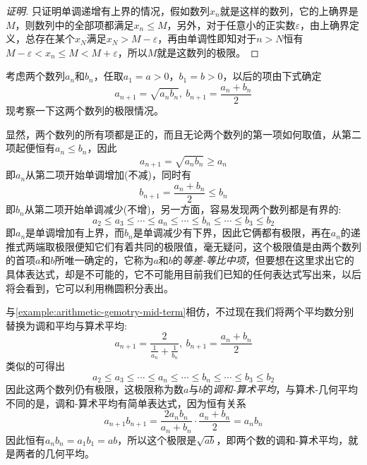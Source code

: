 \begin{proof}[证明]
  只证明单调递增有上界的情况，假如数列$x_n$就是这样的数列，它的上确界是$M$，则数列中的全部项都满足$x_n \leqslant M$，另外，对于任意小的正实数$\varepsilon$，由上确界定义，总存在某个$x_N$满足$x_N>M-\varepsilon$，再由单调性即知对于$n>N$恒有$M-\varepsilon < x_n \leqslant M < M+\varepsilon$，所以$M$就是这数列的极限。
\end{proof}

\begin{example}[等差-等比中项]
  \label{example:arithmetic-gemotry-mid-term}
  考虑两个数列$a_n$和$b_n$，任取$a_1=a>0$，$b_1=b>0$，以后的项由下式确定
  \[ a_{n+1} = \sqrt{a_nb_n}, \  b_{n+1}=\frac{a_n+b_n}{2} \]
  现考察一下这两个数列的极限情况。

  显然，两个数列的所有项都是正的，而且无论两个数列的第一项如何取值，从第二项起便恒有$a_n \leqslant b_n$，因此
  \[ a_{n+1} = \sqrt{a_nb_n} \geqslant a_n \]
  即$a_n$从第二项开始单调增加(不减)，同时有
  \[ b_{n+1} = \frac{a_n+b_n}{2} \leqslant b_n \]
  即$b_n$从第二项开始单调减少(不增)，另一方面，容易发现两个数列都是有界的:
  \[ a_2 \leqslant a_3 \leqslant \cdots \leqslant a_n \leqslant \cdots \leqslant b_n \leqslant \cdots \leqslant b_3 \leqslant b_2  \]
  即$a_n$是单调增加有上界，而$b_n$是单调减少有下界，因此它俩都有极限，再在$a_n$的递推式两端取极限便知它们有着共同的极限值，毫无疑问，这个极限值是由两个数列的首项$a$和$b$所唯一确定的，它称为$a$和$b$的\emph{等差-等比中项}，但要想在这里求出它的具体表达式，却是不可能的，它不可能用目前我们已知的任何表达式写出来，以后将会看到，它可以利用椭圆积分表出。
\end{example}

\begin{example}[调和-算术中项]
  \label{example:harmonic-arithmetic-mid-term}
  与\autoref{example:arithmetic-gemotry-mid-term}相仿，不过现在我们将两个平均数分别替换为调和平均与算术平均:
  \[ a_{n+1} = \frac{2}{\frac{1}{a_n}+\frac{1}{b_n}}, \  b_{n+1} = \frac{a_n+b_n}{2} \]
  类似的可得出
  \[ a_2 \leqslant a_3 \leqslant \cdots \leqslant a_n \leqslant \cdots \leqslant b_n \leqslant \cdots \leqslant b_3 \leqslant b_2  \]
  因此这两个数列仍有极限，这极限称为数$a$与$b$的\emph{调和-算术平均}，与算术-几何平均不同的是，调和-算术平均有简单表达式，因为恒有关系
  \[ a_{n+1}b_{n+1} = \frac{2a_nb_n}{a_n+b_n} \cdot \frac{a_n+b_n}{2} = a_nb_n \]
  因此恒有$a_nb_n=a_1b_1=ab$，所以这个极限是$\sqrt{ab}$，即两个数的调和-算术平均，就是两者的几何平均。
\end{example}


